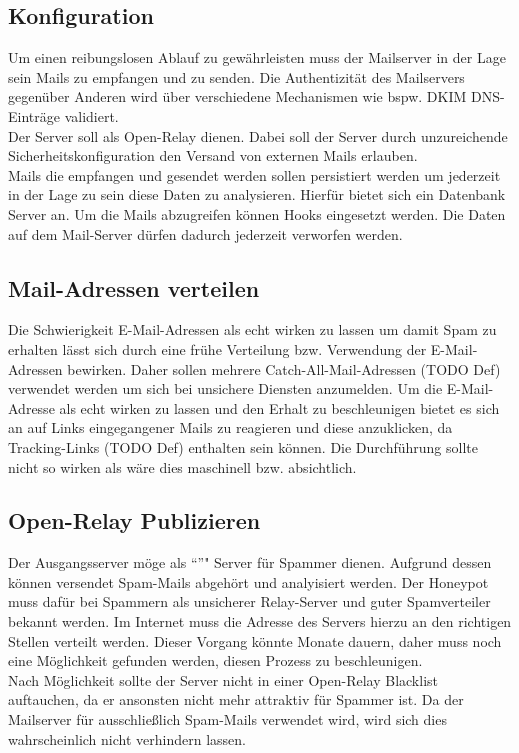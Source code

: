 \documentclass[a4paper,11pt,singlespacing]{article}
\begin{document}
	\subsection{Konfiguration}\label{sec:ProblemstellungKonfiguration}
		Um einen reibungslosen Ablauf zu gewährleisten muss der Mailserver in der Lage sein Mails zu empfangen und zu senden.
		Die Authentizität des Mailservers gegenüber Anderen wird über verschiedene Mechanismen wie bspw. DKIM DNS-Einträge validiert.
		\\
		Der Server soll als Open-Relay dienen.
		Dabei soll der Server durch unzureichende Sicherheitskonfiguration den Versand von externen Mails erlauben.
		\\
		Mails die empfangen und gesendet werden sollen persistiert werden um jederzeit in der Lage zu sein diese Daten zu analysieren.
		Hierfür bietet sich ein Datenbank Server an. Um die Mails abzugreifen können Hooks eingesetzt werden.
		Die Daten auf dem Mail-Server dürfen dadurch jederzeit verworfen werden.

	\subsection{Mail-Adressen verteilen}\label{sec:ProblemstellungMailsVerteilen}
		Die Schwierigkeit E-Mail-Adressen als echt wirken zu lassen um damit Spam zu erhalten lässt sich durch eine frühe Verteilung bzw. Verwendung der E-Mail-Adressen bewirken.
		Daher sollen mehrere Catch-All-Mail-Adressen (TODO Def) verwendet werden um sich bei unsichere Diensten anzumelden.
		Um die E-Mail-Adresse als echt wirken zu lassen und den Erhalt zu beschleunigen bietet es sich an auf Links eingegangener Mails zu reagieren und diese anzuklicken, da Tracking-Links (TODO Def) enthalten sein können.
		Die Durchführung sollte nicht so wirken als wäre dies maschinell bzw. absichtlich.
	
	\subsection{Open-Relay Publizieren}\label{sec:ProblemstellungPublizieren}
		Der Ausgangsserver möge als "`"'" Server für Spammer dienen.
		Aufgrund dessen können versendet Spam-Mails abgehört und analyisiert werden.
		Der Honeypot muss dafür bei Spammern als unsicherer Relay-Server und guter Spamverteiler bekannt werden.
		Im Internet muss die Adresse des Servers hierzu an den richtigen Stellen verteilt werden.
		Dieser Vorgang könnte Monate dauern, daher muss noch eine Möglichkeit gefunden werden, diesen Prozess zu beschleunigen.
		\\
		Nach Möglichkeit sollte der Server nicht in einer Open-Relay Blacklist auftauchen, da er ansonsten nicht mehr attraktiv für Spammer ist.
		Da der Mailserver für ausschließlich Spam-Mails verwendet wird, wird sich dies wahrscheinlich nicht verhindern lassen.
\end{document}
